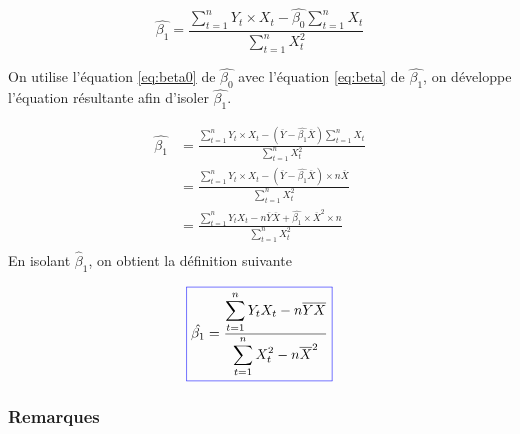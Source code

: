 \documentclass[11pt,french]{report}
\begin{document}
\begin{equation}
\label{eq:beta}
\hat{\beta_1} =  \frac{\displaystyle\sum_{t=1}^n Y_t \times X_t - \hat{\beta_0} \displaystyle\sum_{t=1}^n X_t}{\displaystyle\sum_{t=1}^n X_t^2}
\end{equation}

On utilise l'équation \ref{eq:beta0} de $\hat{\beta_0}$ avec l'équation \ref{eq:beta} de $\hat{\beta_1}$, on développe l'équation résultante afin d'isoler $\hat{\beta_1}$.

\begin{align*}
\hat{\beta_1} &= \frac{\displaystyle\sum_{t=1}^n Y_t \times X_t - (\overline{Y} - \hat{\beta_1}\overline{X})\displaystyle\sum_{t=1}^n X_t}{\displaystyle\sum_{t=1}^n X_t^2} \\
&= \frac{\displaystyle\sum_{t=1}^n Y_t \times X_t - (\overline{Y} - \hat{\beta_1}\overline{X})\times n \overline{X}}{\displaystyle\sum_{t=1}^n X_t^2} \\
&= \frac{\displaystyle\sum_{t=1}^n Y_t X_t - n\overline{Y}\overline{X} + \hat{\beta_1}\times \overline{X}^2 \times n}{\displaystyle\sum_{t=1}^n X_t^2} \\
\end{align*}
En isolant $\hat{\beta}_1$, on obtient la définition suivante

\begin{equation}
\label{eq:beta1}
\color{blue}
\boxed{\color{black}
\hat{\beta_1} = \frac{\displaystyle\sum_{t=1}^n Y_t X_t - n\overline{Y}\overline{X}}{\displaystyle\sum_{t=1}^n X_t^2 - n\overline{X}^2}
}
\end{equation}

\subsubsection{Remarques}
\end{document}
